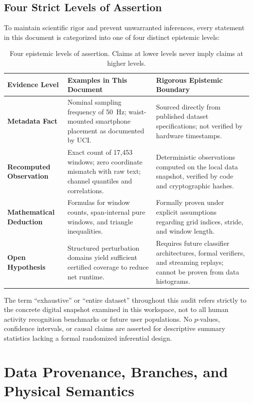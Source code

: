 \documentclass[11pt,a4paper]{article}
\theoremstyle{definition}
\begin{document}
\subsection{Four Strict Levels of Assertion}
To maintain scientific rigor and prevent unwarranted inferences, every statement in this document is categorized into one of four distinct epistemic levels:

\begin{table}[htbp]\centering\small
\begin{tabularx}{\linewidth}{@{}P{2.6cm}Y Y@{}}\toprule
Evidence Level & Examples in This Document & Rigorous Epistemic Boundary\\\midrule
\textbf{Metadata Fact} & Nominal sampling frequency of 50~Hz; waist-mounted smartphone placement as documented by UCI. & Sourced directly from published dataset specifications; not verified by hardware timestamps.\\
\textbf{Recomputed Observation} & Exact count of 17,453 windows; zero coordinate mismatch with raw text; channel quantiles and correlations. & Deterministic observations computed on the local data snapshot, verified by code and cryptographic hashes.\\
\textbf{Mathematical Deduction} & Formulas for window counts, span-internal pure windows, and triangle inequalities. & Formally proven under explicit assumptions regarding grid indices, stride, and window length.\\
\textbf{Open Hypothesis} & Structured perturbation domains yield sufficient certified coverage to reduce net runtime. & Requires future classifier architectures, formal verifiers, and streaming replays; cannot be proven from data histograms.\\\bottomrule
\end{tabularx}
\caption{Four epistemic levels of assertion. Claims at lower levels never imply claims at higher levels.}
\end{table}

The term ``exhaustive'' or ``entire dataset'' throughout this audit refers strictly to the concrete digital snapshot examined in this workspace, not to all human activity recognition benchmarks or future user populations. No $p$-values, confidence intervals, or causal claims are asserted for descriptive summary statistics lacking a formal randomized inferential design.

\section{Data Provenance, Branches, and Physical Semantics}
\end{document}
